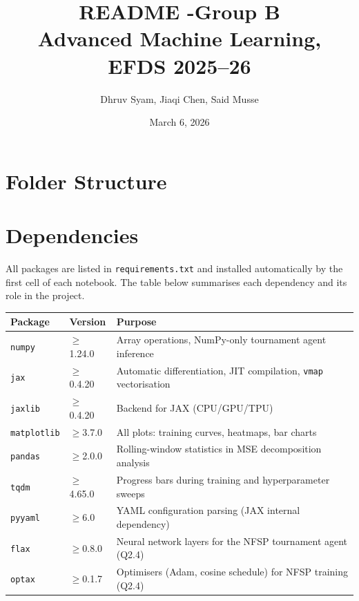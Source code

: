\documentclass[11pt]{article}
\title{README -Group B\\Advanced Machine Learning, EFDS 2025--26}
\author{Dhruv Syam, Jiaqi Chen, Said Musse}
\date{March 6, 2026}
\begin{document}
\maketitle

\section{Folder Structure}

\section{Dependencies}

\noindent All packages are listed in \texttt{requirements.txt} and installed automatically by the first cell of each notebook. The table below summarises each dependency and its role in the project.

\medskip
\begin{center}
\begin{tabular}{lll}
\hline
\textbf{Package} & \textbf{Version} & \textbf{Purpose} \\
\hline
\texttt{numpy}      & $\geq$1.24.0 & Array operations, NumPy-only tournament agent inference \\
\texttt{jax}        & $\geq$0.4.20 & Automatic differentiation, JIT compilation, \texttt{vmap} vectorisation \\
\texttt{jaxlib}     & $\geq$0.4.20 & Backend for JAX (CPU/GPU/TPU) \\
\texttt{matplotlib} & $\geq$3.7.0  & All plots: training curves, heatmaps, bar charts \\
\texttt{pandas}     & $\geq$2.0.0  & Rolling-window statistics in MSE decomposition analysis \\
\texttt{tqdm}       & $\geq$4.65.0 & Progress bars during training and hyperparameter sweeps \\
\texttt{pyyaml}     & $\geq$6.0    & YAML configuration parsing (JAX internal dependency) \\
\texttt{flax}       & $\geq$0.8.0  & Neural network layers for the NFSP tournament agent (Q2.4) \\
\texttt{optax}      & $\geq$0.1.7  & Optimisers (Adam, cosine schedule) for NFSP training (Q2.4) \\
\hline
\end{tabular}
\end{center}
\end{document}
